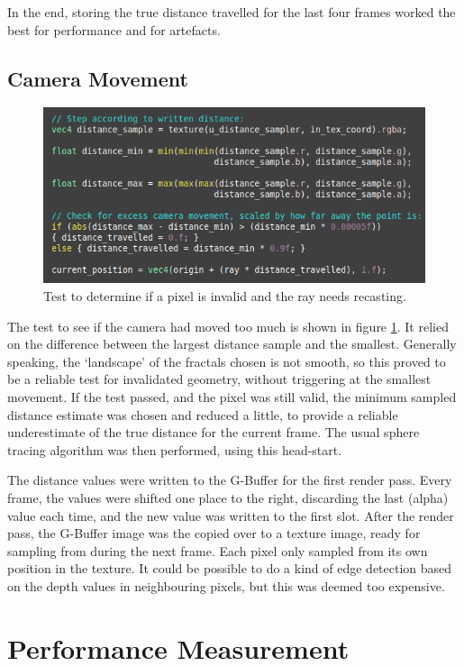 In the end, storing the true distance travelled for the last four frames worked the best for performance and for artefacts.

\subsection{Camera Movement}

\begin{figure}[ht]
	\centering
	\includegraphics[width=0.65\linewidth, frame]{Images/Distance-Test.png}
	\caption{Test to determine if a pixel is invalid and the ray needs recasting.}
	\label{figure:distance-test}
\end{figure}

The test to see if the camera had moved too much is shown in figure \ref{figure:distance-test}. It relied on the difference between the largest distance sample and the smallest. Generally speaking, the `landscape' of the fractals chosen is not smooth, so this proved to be a reliable test for invalidated geometry, without triggering at the smallest movement. If the test passed, and the pixel was still valid, the minimum sampled distance estimate was chosen and reduced a little, to provide a reliable underestimate of the true distance for the current frame. The usual sphere tracing algorithm was then performed, using this head-start.\newline

The distance values were written to the G-Buffer for the first render pass. Every frame, the values were shifted one place to the right, discarding the last (alpha) value each time, and the new value was written to the first slot. After the render pass, the G-Buffer image was the copied over to a texture image, ready for sampling from during the next frame. Each pixel only sampled from its own position in the texture. It could be possible to do a kind of edge detection based on the depth values in neighbouring pixels, but this was deemed too expensive.

\section{Performance Measurement}

